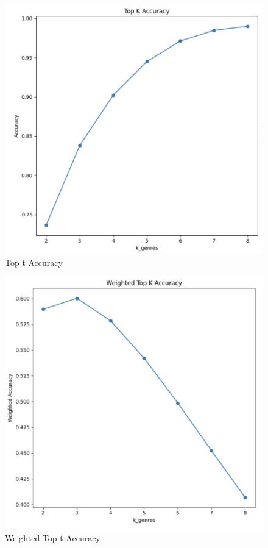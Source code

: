 \documentclass[times, twocolumn]{article}
\begin{document}
\begin{figure}[H]
    \centering
    \includegraphics[width=1.0\linewidth]{KNN_Top_K_Accuracy.png}
    \caption{Top t Accuracy}
    \label{fig:top_t_accuracy}
\end{figure}

\begin{figure}[H]
    \centering
    \includegraphics[width=1.0\linewidth]{KNN_weighted_Top_K_Accuracy.png}
    \caption{Weighted Top t Accuracy}
    \label{fig:weighted_top_t_accuracy}
\end{figure}
\end{document}
